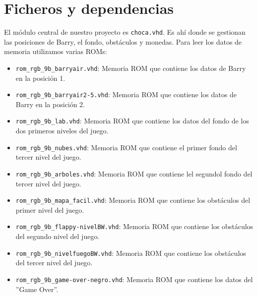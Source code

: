 \documentclass[11pt, a4paper, spanish, openright, twoside]{book}
\begin{document}
\newpage
\mbox{}
\thispagestyle{empty}						%
\newpage


\tableofcontents 							%

\newpage


\vspace{3cm}


\section{Ficheros y dependencias}
El módulo central de nuestro proyecto es \texttt{choca.vhd}. Es ahí donde se gestionan las posiciones de Barry, el fondo, obstáculos y monedas. Para leer los datos de memoria utilizamos varias ROMs:

\begin{itemize}
	\item \texttt{rom\_rgb\_9b\_barryair.vhd}: Memoria ROM que contiene los datos de Barry en la posición 1.
	\item \texttt{rom\_rgb\_9b\_barryair2-5.vhd}: Memoria ROM que contiene los datos de Barry en la posición 2.
	\item \texttt{rom\_rgb\_9b\_lab.vhd}: Memoria ROM que contiene los datos del fondo de los dos primeros niveles del juego.
	\item \texttt{rom\_rgb\_9b\_nubes.vhd}: Memoria ROM que contiene el primer fondo del tercer nivel del juego.
	\item \texttt{rom\_rgb\_9b\_arboles.vhd}: Memoria ROM que contiene lel segundol fondo del tercer nivel del juego.
	\item \texttt{rom\_rgb\_9b\_mapa\_facil.vhd}: Memoria ROM que contiene los obstáculos del primer nivel del juego.
	\item \texttt{rom\_rgb\_9b\_flappy-nivelBW.vhd}: Memoria ROM que contiene los obstáculos del segundo nivel del juego.
	\item \texttt{rom\_rgb\_9b\_nivelfuegoBW.vhd}: Memoria ROM que contiene los obstáculos del tercer nivel del juego.
	\item \texttt{rom\_rgb\_9b\_game-over-negro.vhd}: Memoria ROM que contiene los datos del ''Game Over''.
\end{itemize}
\end{document}
